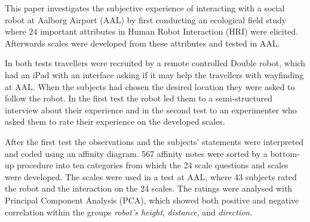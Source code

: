 \label{Abstract}
This paper investigates the subjective experience of interacting with a social robot at Aalborg Airport (AAL) by first conducting an ecological field study where 24 important attributes in Human Robot Interaction (HRI) were elicited. Afterwards scales were developed from these attributes and tested in AAL. 

In both tests travellers were recruited by a remote controlled Double robot, which had an iPad with an interface asking if it may help the travellers with wayfinding at AAL. When the subjects had chosen the desired location they were asked to follow the robot. In the first test the robot led them to a semi-structured interview about their experience and in the second test to an experimenter who asked them to rate their experience on the developed scales. 


After the first test the observations and the subjects' statements were interpreted and coded using an affinity diagram. 567 affinity notes were sorted by a bottom-up procedure into ten categories from which the 24 scale questions and scales were developed. The scales were used in a test at AAL, where 43 subjects rated the robot and the interaction on the 24 scales. The ratings were analysed with Principal Component Analysis (PCA), which showed both positive and negative correlation within the groups \textit{robot's height}, \textit{distance}, and \textit{direction}. 


%
%



